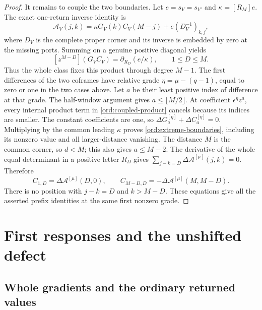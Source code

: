 \documentclass[11pt,a4paper]{amsart}
\numberwithin{equation}{section}
\theoremstyle{plain}
\theoremstyle{definition}
\begin{document}
\begin{proof}
It remains to couple the two boundaries.  Let \(e=s_V=s_{V'}\) and
\(\kappa=[R_M]e\).  The exact one-return inverse identity is
\begin{equation}\label{ord:one-return-adjugate}
 \mathcal A_V(j,k)
 =\kappa G_V(k)C_V(M-j)+e(D_V^{-1})_{k,j},
\end{equation}
where \(D_V\) is the complete proper corner and its inverse is
embedded by zero at the missing ports.
Summing on a genuine positive diagonal yields
\begin{equation}\label{ord:coupled-product}
 [z^{M-D}](G_VC_V)=\partial_{R_D}(e/\kappa),
       \qquad1\le D\le M.
\end{equation}
Thus the whole class fixes this product through degree \(M-1\).
The first differences of the two coframes have relative grade
\(\eta=\mu-(q-1)\), equal to zero or one in the two cases above.
Let \(a\) be their least positive index of difference at that grade.
The half-window argument gives \(a\le\lfloor M/2\rfloor\).
At coefficient \(\epsilon^\eta z^a\), every internal product term in
\eqref{ord:coupled-product} cancels because its indices are smaller.
The constant coefficients are one, so
\(\Delta G_a^{[\eta]}+\Delta C_a^{[\eta]}=0\).
Multiplying by the common leading \(\kappa\) proves
\eqref{ord:extreme-boundaries}, including its nonzero value and all
larger-distance vanishing.  The distance \(M\) is the common corner,
so \(d<M\); this also gives \(a\le M-2\).
The derivative of the whole equal determinant in a positive letter
\(R_D\) gives \(\sum_{j-k=D}\Delta\mathcal A^{[\mu]}(j,k)=0\).
Therefore
\[
 C_{1,D}=\Delta\mathcal A^{[\mu]}(D,0),\qquad
 C_{M-D,D}=-\Delta\mathcal A^{[\mu]}(M,M-D).
\]
There is no position with \(j-k=D\) and \(k>M-D\).
These equations give all the asserted prefix identities at the same
first nonzero grade.
\end{proof}

\section{First responses and the unshifted defect}\label{app:first-responses}

\subsection{Whole gradients and the ordinary returned values}
\end{document}
